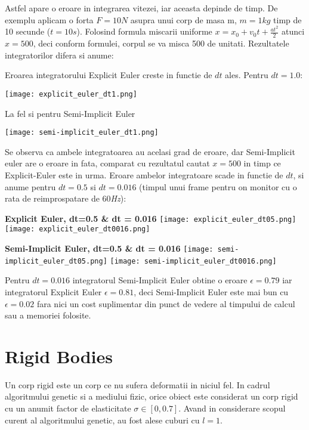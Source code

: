 Astfel apare o eroare in integrarea vitezei, iar aceasta depinde de timp. De exemplu aplicam o forta $F= 10N$ asupra unui corp de masa m, $m = 1kg$ timp de 10 secunde ($t = 10s$). Folosind formula miscarii uniforme $x = x_{0} + v_{0}t + \frac{at^{2}}{2}$ atunci $x = 500$, deci conform formulei, corpul se va misca 500 de unitati. Rezultatele integratorilor difera si anume:

Eroarea integratorului Explicit Euler creste in functie de $dt$ ales. Pentru $dt = 1.0$:
\begin{center}
    \texttt{[image: explicit\_euler\_dt1.png]}
\end{center}
La fel si pentru Semi-Implicit Euler
\begin{center}
    \texttt{[image: semi-implicit\_euler\_dt1.png]}
\end{center}

Se observa ca ambele integratoarea au acelasi grad de eroare, dar Semi-Implicit euler are o eroare in fata, comparat cu rezultatul cautat $x=500$ in timp ce Explicit-Euler este in urma. Eroare ambelor integratoare scade in functie de $dt$, si anume pentru $dt=0.5$ si $dt=0.016$ (timpul unui frame pentru on monitor cu o rata de reimprospatare de 60\textit{Hz}):
\begin{center}
    \textbf{Explicit Euler, dt=0.5 \& dt = 0.016}\linebreak
    \texttt{[image: explicit\_euler\_dt05.png]}
    \texttt{[image: explicit\_euler\_dt0016.png]}
\end{center}
\begin{center}
    \textbf{Semi-Implicit Euler, dt=0.5 \& dt = 0.016}\linebreak
    \texttt{[image: semi-implicit\_euler\_dt05.png]}
    \texttt{[image: semi-implicit\_euler\_dt0016.png]}
\end{center}

Pentru $dt=0.016$ integratorul Semi-Implicit Euler obtine o eroare $\epsilon = 0.79$ iar integratorul Explicit Euler $\epsilon = 0.81$, deci Semi-Implicit Euler este mai bun cu $\epsilon = 0.02$ fara nici un cost suplimentar din punct de vedere al timpului de calcul sau a memoriei folosite.
\section{Rigid Bodies}
Un corp rigid este un corp ce nu sufera deformatii in niciul fel. In cadrul algoritmului genetic si a mediului fizic, orice obiect este considerat un corp rigid cu un anumit factor de elasticitate $\sigma \in [0,0.7]$. Avand in considerare scopul curent al algoritmului genetic, au fost alese cuburi cu $l = 1$. 

